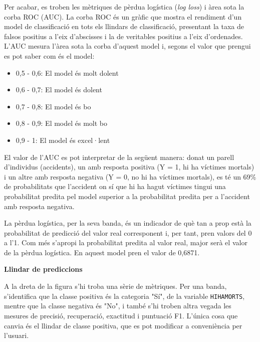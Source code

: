 \documentclass[12pt,longbibliography]{article}
\theoremstyle{definition}
\theoremstyle{remark}
\begin{document}
Per acabar, es troben les mètriques de pèrdua logística (\emph{log loss}) i àrea sota la corba ROC (AUC). La corba ROC és un gràfic que mostra el rendiment d'un model de classificació en tots els llindars de classificació, presentant la taxa de falsos positius a l'eix d'abscisses i la de veritables positius a l'eix d'ordenades. L'AUC mesura l'àrea sota la corba d'aquest model i, segons el valor que prengui es pot saber com és el model:



\begin{itemize}

\item 0,5 - 0,6: El model és molt dolent

\item 0,6 - 0,7: El model és dolent

\item 0,7 - 0,8: El model és bo

\item 0,8 - 0,9: El model és molt bo

\item 0,9 - 1: El model és excel·lent

\end{itemize}



El valor de l’AUC es pot interpretar de la següent manera: donat un parell d’individus (accidents), un amb resposta positiva (Y = 1, hi ha víctimes mortals) i un altre amb resposta negativa (Y = 0, no hi ha víctimes mortals), es té un 69\% de probabilitats que l'accident on sí que hi ha hagut víctimes tingui una probabilitat predita pel model superior a la probabilitat predita per a l'accident amb resposta negativa.



La pèrdua logística, per la seva banda, és un indicador de què tan a prop està la probabilitat de predicció del valor real corresponent i, per tant, pren valors del 0 a l'1. Com més s'apropi la probabilitat predita al valor real, major serà el valor de la pèrdua logística. En aquest model pren el valor de 0,6871.



\textbf{Llindar de prediccions}



A la dreta de la figura s'hi troba una sèrie de mètriques. Per una banda, s'identifica que la classe positiva és la categoria "Sí", de la variable \texttt{HIHAMORTS}, mentre que la classe negativa és "No", i també s'hi troben altra vegada les mesures de precisió, recuperació, exactitud i puntuació F1. L'única cosa que canvia és el llindar de classe positiva, que es pot modificar a conveniència per l'usuari.
\end{document}
